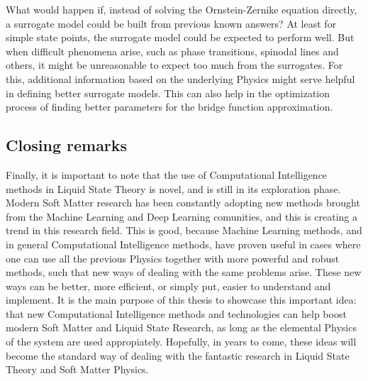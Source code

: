 What would happen if, instead of solving the Ornstein-Zernike equation directly, a 
surrogate model could be built from previous known answers? At least for simple state 
points, the surrogate model could be expected to perform well. But when difficult phenomena 
arise, such as phase transitions, spinodal lines and others, it might be unreasonable to 
expect too much from the surrogates. For this, additional information based on the 
underlying Physics might serve helpful in defining better surrogate models. This can also 
help in the optimization process of finding better parameters for the bridge function 
approximation.

\subsection{Closing remarks}
Finally, it is important to note that the use of Computational Intelligence methods in 
Liquid State Theory is novel, and is still in its exploration phase. Modern Soft Matter 
research has been constantly adopting new methods brought from the Machine Learning and 
Deep Learning comunities, and this is creating a trend in this research field. This is 
good, because Machine Learning methods, and in general Computational Intelligence methods, 
have proven useful in cases where one can use all the previous Physics together with more 
powerful and robust methods, such that new ways of dealing with the same problems arise. 
These new ways can be better, more efficient, or simply put, easier to understand and 
implement. It is the main purpose of this thesis to showcase this important idea: that new 
Computational Intelligence methods and technologies can help boost modern Soft Matter and 
Liquid State Research, as long as the elemental Physics of the system are used 
appropiately. Hopefully, in years to come, these ideas will become the standard way of 
dealing with the fantastic research in Liquid State Theory and Soft Matter Physics.